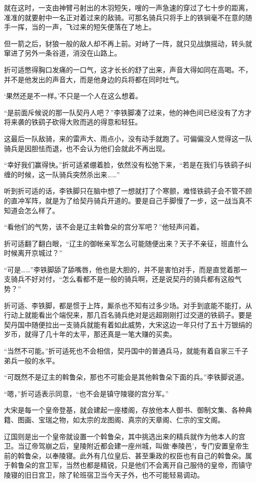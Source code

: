 就在这时，一支由神臂弓射出的木羽短矢，嗖的一声急速的穿过了七十步的距离，准准的就要射中一名正对着过来的敌骑。可那名骑兵只将手上的铁锏毫不在意的随手一挥，当的一声，飞过来的短矢便落在了地上。

但一箭之后，豺狼一般的敌人却不再上前。对峙了一阵，就只见战旗摇动，转头就窜进了另外一条谷道，消没在山路上。

折可适憋得胸口发痛的一口气，这才长长的舒了出来，声音大得如同在高喝。不，并不是他发出的声音大，而是他身边的兵将都在同时吐气。

‘果然还是不一样。’不只是一个人在这么想着。

“是前面斥候说的那一队契丹人吧？”李铁脚凑了过来，他的神色间已经没有了方才将来袭的铁鹞子砍得大败而逃的得意和轻狂。

这最后一队敌骑，来的雷声大、雨点小，没有动手就跑了。可偏偏没人觉得这一队骑兵是因胆怯而退，也不会认为他们会就此不再出现。

“幸好我们赢得快。”折可适紧绷着脸，依然没有松弛下来，“若是在我们与铁鹞子纠缠的时候，这一队骑兵突然杀出来……”

听到折可适的话，李铁脚只在脑中想了一想就打了个寒颤，难怪铁鹞子会不管不顾的直冲军阵，就是为了给契丹骑兵开道的。要是自己手脚慢了一步，这一战当真不知道会怎么样了。

“看他们的气势，该不会是辽主斡鲁朵的宫分军吧？”他轻声问着。

折可适翻了翻白眼，“辽主的御帐亲军怎么可能随便出来？天子不亲征，班直什么时候离开京城过？”

“可是……”李铁脚舔了舔嘴唇，他也是大胆的，并不是害怕对手，而是直觉着那一支骑兵不好对付，“怎么看都不是一般的骑兵啊，还是说契丹的骑兵都有这般气势？”

折可适、李铁脚，都是惯于上阵，厮杀也不知有过多少场。对手到底能不能打，从行动上就能看出个端倪来，那几百名骑兵绝对是远超刚刚打过交道的铁鹞子。要是契丹国中随便拉出一支骑兵就能有着如此威势，大宋这边一年只付了五十万银绢的岁币，就得了几十年的太平，那还真是一笔大赚的买卖。

“当然不可能。”折可适死也不会相信，契丹国中的普通兵马，就能有着自家三千子弟兵一般的水平。

“可既然不是辽主的斡鲁朵，那也不可能会是其他斡鲁朵下面的兵。”李铁脚说道。

“嗯，”折可适表示同意，“也不会是镇守陵寝的宫分军。”

大宋是每一个皇帝登基，就会建起一座楼阁，存放他本人御书、御制文集、各种典籍、图画、宝瑞之物，如太宗的龙图阁、真宗的天章阁、仁宗的宝文阁。

辽国则是出一个皇帝就设置一个斡鲁朵，其中挑选出来的精兵就作为他本人的宫卫。当辽帝驾崩之后，皇陵附近都会建一座州城，叫做‘奉陵邑’，专门安置皇帝生前的斡鲁朵，以奉陵寝。此外有几位皇后、甚至秉政的权臣也有自己的斡鲁朵。属于斡鲁朵的宫卫军，当然也都是精锐，只是他们不会离开自己服侍的皇帝，而镇守陵寝的旧日宫卫，除了轮班宿卫当今天子外，也不可能轻易调动。

